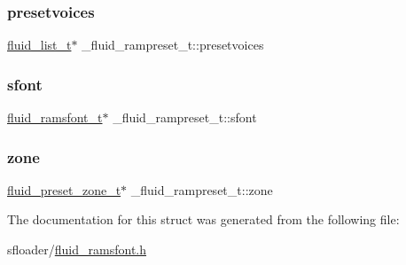 \mbox{\label{struct__fluid__rampreset__t_a3df2cef0a7f82e89bc49e68150e97658}} 
\subsubsection{\texorpdfstring{presetvoices}{presetvoices}}
{\footnotesize\ttfamily \hyperlink{fluid__list_8h_a3ef7535d4290862c0af118569223bd89}{fluid\+\_\+list\+\_\+t}$\ast$ \+\_\+fluid\+\_\+rampreset\+\_\+t\+::presetvoices}

\mbox{\label{struct__fluid__rampreset__t_a96888a85aa777e9e89e7696cc8bd9947}} 
\subsubsection{\texorpdfstring{sfont}{sfont}}
{\footnotesize\ttfamily \hyperlink{types_8h_a093fe32472dd43adaef22c62feb2d15e}{fluid\+\_\+ramsfont\+\_\+t}$\ast$ \+\_\+fluid\+\_\+rampreset\+\_\+t\+::sfont}

\mbox{\label{struct__fluid__rampreset__t_aa2c9ac5d07d1c5cc309f830cabbe4ffd}} 
\subsubsection{\texorpdfstring{zone}{zone}}
{\footnotesize\ttfamily \hyperlink{fluid__defsfont_8h_a74cb7075332911049d39e60df50019b2}{fluid\+\_\+preset\+\_\+zone\+\_\+t}$\ast$ \+\_\+fluid\+\_\+rampreset\+\_\+t\+::zone}



The documentation for this struct was generated from the following file\+:\begin{DoxyCompactItemize}
\item 
sfloader/\hyperlink{fluid__ramsfont_8h}{fluid\+\_\+ramsfont.\+h}\end{DoxyCompactItemize}
